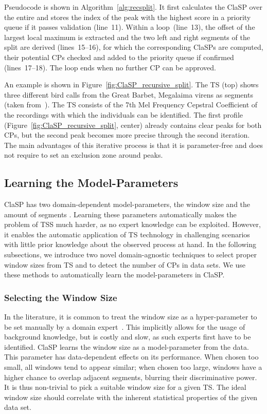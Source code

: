 \documentclass[pdflatex,sn-basic]{sn-jnl}
\begin{document}
Pseudocode is shown in Algorithm~\ref{alg:recsplit}. It first calculates the ClaSP over the entire  and stores the index of the peak with the highest score in a priority queue if it passes validation (line~11). Within a loop~(line~13), the offset of the largest local maximum  is extracted and the two left and right segments of the split  are derived (lines~15--16), for which the corresponding ClaSPs are computed, their potential CPs checked and added to the priority queue if confirmed (lines~17--18). The loop ends when no further CP can be approved.

An example is shown in Figure~\ref{fig:ClaSP_recursive_split}. The TS (top) shows three different bird calls from the Great Barbet, Megalaima virens as segments (taken from~\citep{gharghabi2017matrix}). The TS consists of the 7th Mel Frequency Cepstral Coefficient of the recordings with which the individuals can be identified. The first profile (Figure~\ref{fig:ClaSP_recursive_split}, center) already contains clear peaks for both CPs, but the second peak becomes more precise through the second iteration. The main advantages of this iterative process is that it is parameter-free and does not require to set an exclusion zone around peaks. 


\subsection{Learning the Model-Parameters} \label{sec:model-param}

ClaSP has two domain-dependent model-parameters, the window size  and the amount of segments . Learning these parameters automatically makes the problem of TSS much harder, as no expert knowledge can be exploited. However, it enables the automatic application of TS technology in challenging scenarios with little prior knowledge about the observed process at hand. In the following subsections, we introduce two novel domain-agnostic techniques to select proper window sizes from TS and to detect the number of CPs in data sets. We use these methods to automatically learn the model-parameters in ClaSP. 

\subsubsection{Selecting the Window Size} \label{sec:window-size-selec}

In the literature, it is common to treat the window size as a hyper-parameter to be set manually by a domain expert~\citep{gharghabi2017matrix}. This implicitly allows for the usage of background knowledge, but is costly and slow, as such experts first have to be identified. ClaSP learns the window size  as a model-parameter from the data. This parameter has data-dependent effects on its performance. When chosen too small, all windows tend to appear similar; when chosen too large, windows have a higher chance to overlap adjacent segments, blurring their discriminative power. It is thus non-trivial to pick a suitable window size for a given TS. The ideal window size should correlate with the inherent statistical properties of the given data set.
\end{document}
